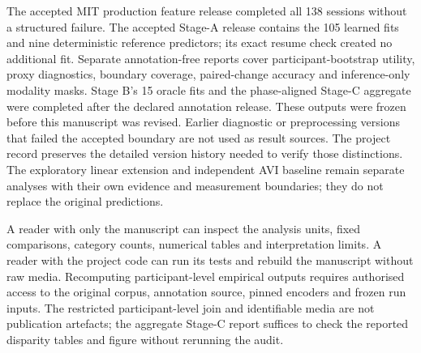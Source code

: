 The accepted MIT production feature release completed all 138 sessions without a structured
failure. The accepted Stage-A release contains the 105 learned fits and nine deterministic
reference predictors; its exact resume check created no additional fit. Separate
annotation-free reports cover participant-bootstrap utility, proxy diagnostics, boundary
coverage, paired-change accuracy and inference-only modality masks. Stage B's 15 oracle
fits and the phase-aligned Stage-C aggregate were completed after the declared annotation
release. These outputs were frozen before this manuscript was revised. Earlier diagnostic
or preprocessing versions that failed the accepted boundary are not used as result
sources. The project record preserves the detailed version history needed to verify those
distinctions. The exploratory linear extension and independent AVI baseline remain
separate analyses with their own evidence and measurement boundaries; they do not
replace the original predictions.

A reader with only the manuscript can inspect the analysis units, fixed comparisons,
category counts, numerical tables and interpretation limits. A reader with the project
code can run its tests and rebuild the manuscript without raw media. Recomputing
participant-level empirical outputs requires authorised access to the original corpus,
annotation source, pinned encoders and frozen run inputs. The restricted participant-level
join and identifiable media are not publication artefacts; the aggregate Stage-C report
suffices to check the reported disparity tables and figure without rerunning the audit.
